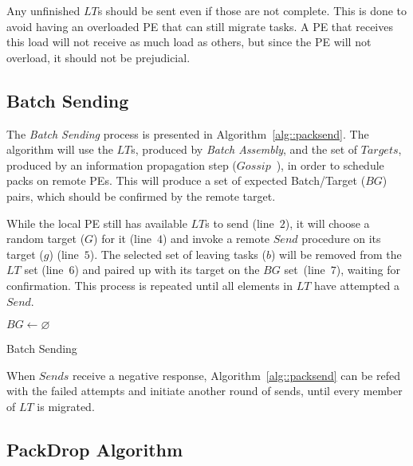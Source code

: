 Any unfinished $LT$s should be sent even if those are not complete.
This is done to avoid having an overloaded PE that can still migrate tasks.
A PE that receives this load will not receive as much load as others, but since the PE will not overload, it should not be prejudicial.

\subsection{Batch Sending} \label{sec:algo:sending}

The \textit{Batch Sending} process is presented in Algorithm~\ref{alg::packsend}.
The algorithm will use the $LT$s, produced by \textit{Batch Assembly}, and the set of $Targets$, produced by an information propagation step ($Gossip$~\cite{gossip}), in order to schedule packs on remote PEs.
This will produce a set of expected Batch/Target ($BG$) pairs, which should be confirmed by the remote target.

While the local PE still has available $LT$s to send (line~$2$), it will choose a random target ($G$) for it (line~$4$) and invoke a remote $Send$ procedure on its target ($g$) (line~$5$).
The selected set of leaving tasks ($b$) will be removed from the $LT$ set (line~$6$) and paired up with its target on the $BG$ set~(line~$7$), waiting for confirmation.
This process is repeated until all elements in $LT$ have attempted a $Send$.

\begin{algorithm}[!ht]
    \DontPrintSemicolon
    $BG \gets \varnothing$ \\
    \caption{Batch Sending}  
    \label{alg::packsend}
\end{algorithm}

When $Sends$ receive a negative response, Algorithm~\ref{alg::packsend} can be refed with the failed attempts and initiate another round of sends, until every member of $LT$ is migrated.

\subsection{PackDrop Algorithm} \label{sec:algo:main}


